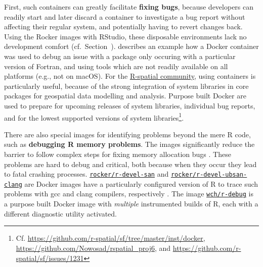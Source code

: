 First, such containers can greatly facilitate \textbf{fixing bugs},
because developers can readily start and later discard a container to
investigate a bug report without affecting their regular system, and
potentially having to revert changes back. Using the Rocker images with
RStudio, these disposable environments lack no development comfort
(cf.~Section~). \citet{eddelbuettel_debugging_2019}
describes an example how a Docker container was used to debug an issue
with a package only occuring with a particular version of Fortran, and
using tools which are not readily available on all platforms (e.g., not
on macOS). For the \href{https://www.r-spatial.org/}{R-spatial
community}, using containers is particularly useful, because of the
strong integration of system libraries in core packages for geospatial
data modelling and analysis. Purpose built Docker are used to prepare
for upcoming releases of system libraries, individual bug reports, and
for the lowest supported versions of system
libraries\footnote{Cf. \href{https://github.com/r-spatial/sf/tree/master/inst/docker}{https://github.com/r-spatial/sf/tree/master/inst/docker}, \href{https://github.com/Nowosad/rspatial_proj6}{https://github.com/Nowosad/rspatial\_proj6}, and \href{https://github.com/r-spatial/sf/issues/1231}{https://github.com/r-spatial/sf/issues/1231}}.

There are also special images for identifying problems beyond the mere R
code, such as \textbf{debugging R memory problems}. The images
significantly reduce the barrier to follow complex steps for fixing
memory allocation bugs \citep[cf. Section~4.3 in][]{core_writing_1999}.
These problems are hard to debug and critical, both because when they
occur they lead to fatal crashing processes.
\href{https://github.com/rocker-org/r-devel-san}{\texttt{rocker/r-devel-san}}
and
\href{https://github.com/rocker-org/r-devel-san-clang}{\texttt{rocker/r-devel-ubsan-clang}}
are Docker images have a particularly configured version of R to trace
such problems with gcc and clang compilers, respectively
\citep[cf.~ for examples,][]{eddelbuettel_sanitizers_2014}.
The image \href{https://github.com/wch/r-debug}{\texttt{wch/r-debug}} is
a purpose built Docker image with \emph{multiple} instrumented builds of
R, each with a different diagnostic utility activated.

